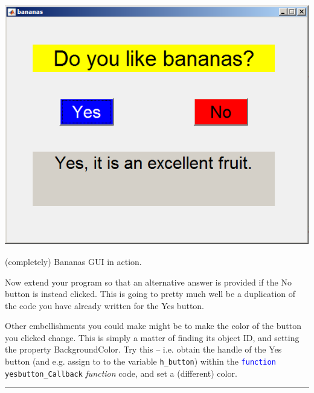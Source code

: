 \documentclass{tufte-book} %
\begin{document}
\begin{marginfigure}[0.0in]
\includegraphics[width=\linewidth]{chGUI-bananas2.png}
\caption{(completely) Bananas GUI in action.}
\label{fig:chGUI-bananas2}
\end{marginfigure}

Now extend your program so that an alternative answer is provided if the \textsf{No} button is instead clicked. This is going to pretty much well be a duplication of the code you have already written for the \textsf{Yes} button.

Other embellishments you could make might be to make the color of the button you clicked change. This is simply a matter of finding its object ID, and setting the property \textsf{BackgroundColor}. Try this -- i.e. obtain the handle of the Yes button (and e.g. assign to to the variable \texttt{h\_button}) within the \texttt{\textcolor{blue}{function} yesbutton\_Callback} \textit{function} code, and set a (different) color.

\vspace{1mm}
\noindent\rule{4cm}{0.5pt}
\vspace{2mm}
\end{document}
